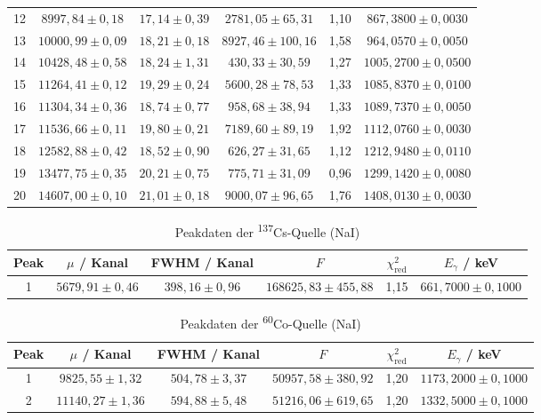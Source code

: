 \begin{table}[H]
\begin{tabular}{|c|c|c|c|c|c|}
12 & $8997,84 \pm 0,18$ & $17,14 \pm 0,39$ & $2781,05 \pm 65,31$ & 1,10 & $867,3800 \pm 0,0030$ \\
13 & $10000,99 \pm 0,09$ & $18,21 \pm 0,18$ & $8927,46 \pm 100,16$ & 1,58 & $964,0570 \pm 0,0050$ \\
14 & $10428,48 \pm 0,58$ & $18,24 \pm 1,31$ & $430,33 \pm 30,59$ & 1,27 & $1005,2700 \pm 0,0500$ \\
15 & $11264,41 \pm 0,12$ & $19,29 \pm 0,24$ & $5600,28 \pm 78,53$ & 1,33 & $1085,8370 \pm 0,0100$ \\
16 & $11304,34 \pm 0,36$ & $18,74 \pm 0,77$ & $958,68 \pm 38,94$ & 1,33 & $1089,7370 \pm 0,0050$ \\
17 & $11536,66 \pm 0,11$ & $19,80 \pm 0,21$ & $7189,60 \pm 89,19$ & 1,92 & $1112,0760 \pm 0,0030$ \\
18 & $12582,88 \pm 0,42$ & $18,52 \pm 0,90$ & $626,27 \pm 31,65$ & 1,12 & $1212,9480 \pm 0,0110$ \\
19 & $13477,75 \pm 0,35$ & $20,21 \pm 0,75$ & $775,71 \pm 31,09$ & 0,96 & $1299,1420 \pm 0,0080$ \\
20 & $14607,00 \pm 0,10$ & $21,01 \pm 0,18$ & $9000,07 \pm 96,65$ & 1,76 & $1408,0130 \pm 0,0030$ \\
\hline
\end{tabular}
\label{taba_2}
\end{table}


\begin{table}[H]
\centering
\caption{Peakdaten der \textsuperscript{137}Cs-Quelle (NaI)}
\begin{tabular}{|c|c|c|c|c|c|}
\hline
Peak & $\mu$ / Kanal & FWHM / Kanal & $F$ & $\chi^2_\mathrm{red}$ & $E_\gamma$ / keV \\
\hline
1 & $5679,91 \pm 0,46$ & $398,16 \pm 0,96$ & $168625,83 \pm 455,88$ & 1,15 & $661,7000 \pm 0,1000$ \\
\hline
\end{tabular}
\label{NaI_Caesium}
\end{table}

\begin{table}[H]
\centering
\caption{Peakdaten der \textsuperscript{60}Co-Quelle (NaI)}
\begin{tabular}{|c|c|c|c|c|c|}
\hline
Peak & $\mu$ / Kanal & FWHM / Kanal & $F$ & $\chi^2_\mathrm{red}$ & $E_\gamma$ / keV \\
\hline
1 & $9825,55 \pm 1,32$ & $504,78 \pm 3,37$ & $50957,58 \pm 380,92$ & 1,20 & $1173,2000 \pm 0,1000$ \\
2 & $11140,27 \pm 1,36$ & $594,88 \pm 5,48$ & $51216,06 \pm 619,65$ & 1,20 & $1332,5000 \pm 0,1000$ \\
\hline
\end{tabular}
\label{NaI_Cobalt}
\end{table}


